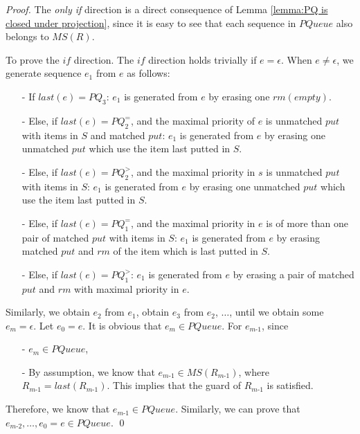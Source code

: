 \PQasMultiInMRpriforSequence*

\begin {proof}

The \textit{only if} direction is a direct consequence of Lemma \ref{lemma:PQ is closed under projection}, since it is easy to see that each sequence in $\textit{PQueue}$ also belongs to $\textit{MS}(R)$.

To prove the $\textit{if}$ direction. The $\textit{if}$ direction holds trivially if $e = \epsilon$. When $e \neq \epsilon$, we generate sequence $e_1$ from $e$ as follows:

\begin{itemize}
\setlength{\itemsep}{0.5pt}
\item[-] If $\textit{last}(e) = \textit{PQ}_3$: $e_1$ is generated from $e$ by erasing one $\textit{rm}(\textit{empty})$.

\item[-] Else, if $\textit{last}(e) = \textit{PQ}_2^{=}$, and the maximal priority of $e$ is unmatched $\textit{put}$ with items in $S$ and matched $\textit{put}$: $e_1$ is generated from $e$ by erasing one unmatched $\textit{put}$ which use the item last putted in $S$.

\item[-] Else, if $\textit{last}(e) = \textit{PQ}_2^{>}$, and the maximal priority in $s$ is unmatched $\textit{put}$ with items in $S$: $e_1$ is generated from $e$ by erasing one unmatched $\textit{put}$ which use the item last putted in $S$.

\item[-] Else, if $\textit{last}(e) = \textit{PQ}_1^{=}$, and the maximal priority in $e$ is of more than one pair of matched $\textit{put}$ with items in $S$: $e_1$ is generated from $e$ by erasing matched $\textit{put}$ and $\textit{rm}$ of the item which is last putted in $S$.

\item[-] Else, if $\textit{last}(e) = \textit{PQ}_1^{>}$: $e_1$ is generated from $e$ by erasing a pair of matched $\textit{put}$ and $\textit{rm}$ with maximal priority in $e$.
\end{itemize}

Similarly, we obtain $e_2$ from $e_1$, obtain $e_3$ from $e_2$, $\ldots$, until we obtain some $e_m = \epsilon$. Let $e_0=e$. It is obvious that $e_m \in \textit{PQueue}$. For $e_{\textit{m-1}}$, since

\begin{itemize}
\setlength{\itemsep}{0.5pt}
\item[-] $e_m \in \textit{PQueue}$,

\item[-] By assumption, we know that $e_{\textit{m-1}} \in \textit{MS}(R_{\textit{m-1}})$, where $R_{\textit{m-1}} = \textit{last}(R_{\textit{m-1}})$. This implies that the guard of $R_{\textit{m-1}}$ is satisfied.
\end{itemize}

Therefore, we know that $e_{\textit{m-1}} \in \textit{PQueue}$. Similarly, we can prove that $e_{\textit{m-2}},\ldots,e_0 = e \in \textit{PQueue}$. \qed
\end {proof}

